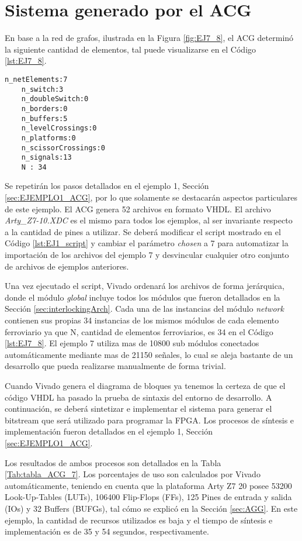 \section{Sistema generado por el ACG}

	En base a la red de grafos, ilustrada en la Figura \ref{fig:EJ7_8}, el ACG determinó la siguiente cantidad de elementos, tal puede visualizarse en el Código \ref{lst:EJ7_8}.
	
	\begin{lstlisting}[language = {}, caption = Cantidad de elementos a implementar por el ACG, label = {lst:EJ7_8}]
	n_netElements:7
	n_switch:3
	n_doubleSwitch:0
	n_borders:0
	n_buffers:5
	n_levelCrossings:0
	n_platforms:0
	n_scissorCrossings:0
	n_signals:13
	N : 34
	\end{lstlisting}
	
	Se repetirán los pasos detallados en el ejemplo 1, Sección \ref{sec:EJEMPLO1_ACG}, por lo que solamente se destacarán aspectos particulares de este ejemplo. El ACG genera 52 archivos en formato VHDL. El archivo \textit{Arty\_Z7-10.XDC} es el mismo para todos los ejemplos, al ser invariante respecto a la cantidad de pines a utilizar. Se deberá modificar el script mostrado en el Código \ref{lst:EJ1_script} y cambiar el parámetro \textit{chosen} a 7 para automatizar la importación de los archivos del ejemplo 7 y desvincular cualquier otro conjunto de archivos de ejemplos anteriores.

	Una vez ejecutado el script, Vivado ordenará los archivos de forma jerárquica, donde el módulo \textit{global} incluye todos los módulos que fueron detallados en la Sección \ref{sec:interlockingArch}. Cada una de las instancias del módulo \textit{network} contienen sus propias 34 instancias de los mismos módulos de cada elemento ferroviario ya que N, cantidad de elementos ferroviarios, es 34 en el Código \ref{lst:EJ7_8}. El ejemplo 7 utiliza mas de 10800 sub módulos conectados automáticamente mediante mas de 21150 señales, lo cual se aleja bastante de un desarrollo que pueda realizarse manualmente de forma trivial.
	
	Cuando Vivado genera el diagrama de bloques ya tenemos la certeza de que el código VHDL ha pasado la prueba de sintaxis del entorno de desarrollo. A continuación, se deberá sintetizar e implementar el sistema para generar el bitstream que será utilizado para programar la FPGA. Los procesos de síntesis e implementación fueron detallados en el ejemplo 1, Sección \ref{sec:EJEMPLO1_ACG}.
	
	Los resultados de ambos procesos son detallados en la Tabla \ref{Tab:tabla_ACG_7}. Los porcentajes de uso son calculados por Vivado automáticamente, teniendo en cuenta que la plataforma Arty Z7 20 posee 53200 Look-Up-Tables (LUTs), 106400 Flip-Flops (FFs), 125 Pines de entrada y salida (IOs) y 32 Buffers (BUFGs), tal cómo se explicó en la Sección \ref{sec:AGG}. En este ejemplo, la cantidad de recursos utilizados es baja y el tiempo de síntesis e implementación es de 35 y 54 segundos, respectivamente.
	
